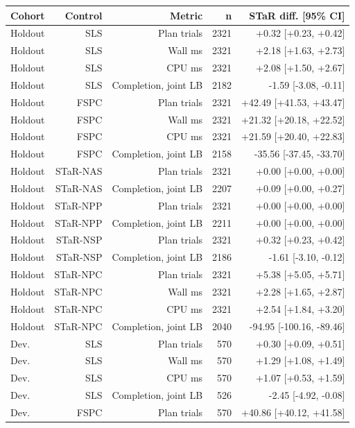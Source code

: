 \begingroup
\small
\setlength{\tabcolsep}{3pt}
\begin{longtable}{@{}lrrrr@{}}
\toprule
Cohort & Control & Metric & n & STaR diff. [95\% CI] \\
\midrule
\endhead
Holdout & SLS & Plan trials & 2321 & +0.32 [+0.23, +0.42] \\
Holdout & SLS & Wall ms & 2321 & +2.18 [+1.63, +2.73] \\
Holdout & SLS & CPU ms & 2321 & +2.08 [+1.50, +2.67] \\
Holdout & SLS & Completion, joint LB & 2182 & -1.59 [-3.08, -0.11] \\
Holdout & FSPC & Plan trials & 2321 & +42.49 [+41.53, +43.47] \\
Holdout & FSPC & Wall ms & 2321 & +21.32 [+20.18, +22.52] \\
Holdout & FSPC & CPU ms & 2321 & +21.59 [+20.40, +22.83] \\
Holdout & FSPC & Completion, joint LB & 2158 & -35.56 [-37.45, -33.70] \\
Holdout & STaR-NAS & Plan trials & 2321 & +0.00 [+0.00, +0.00] \\
Holdout & STaR-NAS & Completion, joint LB & 2207 & +0.09 [+0.00, +0.27] \\
Holdout & STaR-NPP & Plan trials & 2321 & +0.00 [+0.00, +0.00] \\
Holdout & STaR-NPP & Completion, joint LB & 2211 & +0.00 [+0.00, +0.00] \\
Holdout & STaR-NSP & Plan trials & 2321 & +0.32 [+0.23, +0.42] \\
Holdout & STaR-NSP & Completion, joint LB & 2186 & -1.61 [-3.10, -0.12] \\
Holdout & STaR-NPC & Plan trials & 2321 & +5.38 [+5.05, +5.71] \\
Holdout & STaR-NPC & Wall ms & 2321 & +2.28 [+1.65, +2.87] \\
Holdout & STaR-NPC & CPU ms & 2321 & +2.54 [+1.84, +3.20] \\
Holdout & STaR-NPC & Completion, joint LB & 2040 & -94.95 [-100.16, -89.46] \\
Dev. & SLS & Plan trials & 570 & +0.30 [+0.09, +0.51] \\
Dev. & SLS & Wall ms & 570 & +1.29 [+1.08, +1.49] \\
Dev. & SLS & CPU ms & 570 & +1.07 [+0.53, +1.59] \\
Dev. & SLS & Completion, joint LB & 526 & -2.45 [-4.92, -0.08] \\
Dev. & FSPC & Plan trials & 570 & +40.86 [+40.12, +41.58] \\

\end{longtable}
